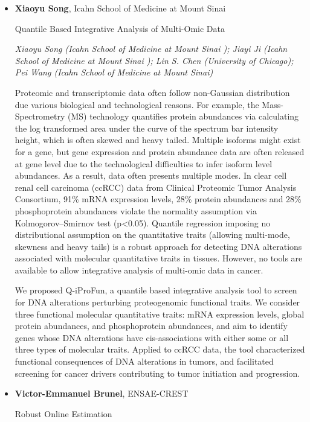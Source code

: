 \begin{itemize}
\item \textbf{Xiaoyu Song}, Icahn School of Medicine at Mount Sinai

Quantile Based Integrative Analysis of Multi-Omic Data

\emph{\footnotesize Xiaoyu Song (Icahn School of Medicine at Mount Sinai ); Jiayi Ji (Icahn School of Medicine at Mount Sinai ); Lin S. Chen (University of Chicago); Pei Wang (Icahn School of Medicine at Mount Sinai)}

Proteomic and transcriptomic data often follow non-Gaussian distribution due various biological and technological reasons. For example, the Mass-Spectrometry (MS) technology quantifies protein abundances via calculating the log transformed area under the curve of the spectrum bar intensity height, which is often skewed and heavy tailed. Multiple isoforms might exist for a gene, but gene expression and protein abundance data are often released at gene level due to the technological difficulties to infer isoform level abundances. As a result, data often presents multiple modes. In clear cell renal cell carcinoma (ccRCC) data from Clinical Proteomic Tumor Analysis Consortium, 91\% mRNA expression levels,  28\% protein abundances and 28\% phosphoprotein abundances violate the normality assumption via Kolmogorov–Smirnov test (p<0.05). Quantile regression imposing no distributional assumption on the quantitative traits (allowing multi-mode, skewness and heavy tails) is a robust approach for detecting DNA alterations associated with molecular quantitative traits in tissues. However, no tools are available to allow integrative analysis of multi-omic data in cancer. 

We proposed Q-iProFun, a quantile based integrative analysis tool to screen for DNA alterations perturbing proteogenomic functional traits. We consider three functional molecular quantitative traits: mRNA expression levels, global protein abundances, and phosphoprotein abundances, and aim to identify genes whose DNA alterations have cis-associations with either some or all three types of molecular traits. Applied to ccRCC data, the tool characterized functional consequences of DNA alterations in tumors, and facilitated screening for cancer drivers contributing to tumor initiation and progression.

\item \textbf{Victor-Emmanuel Brunel}, ENSAE-CREST

Robust Online Estimation


\end{itemize}
